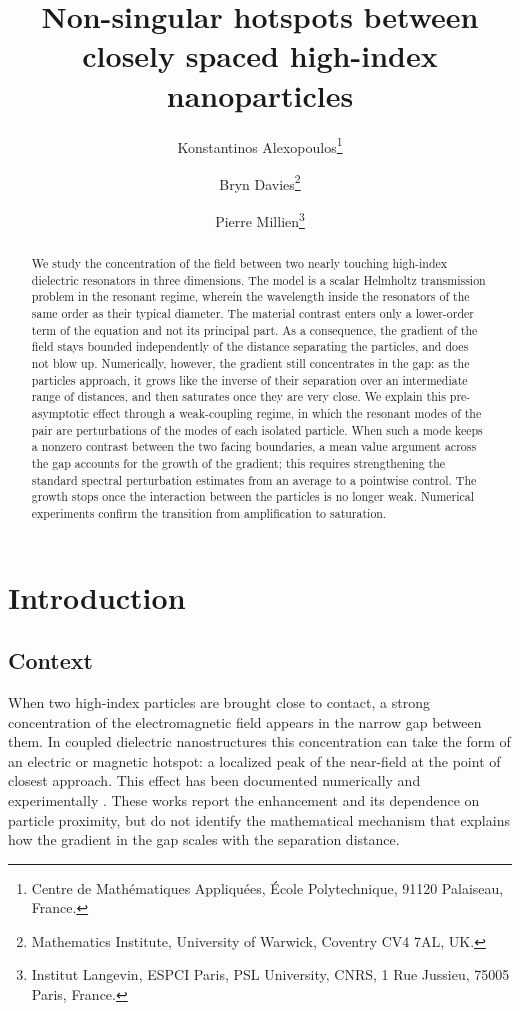 \documentclass[10pt]{article}
\title{Non-singular hotspots between closely spaced high-index nanoparticles}
\author{Konstantinos Alexopoulos\thanks{Centre de Mathématiques Appliquées, École Polytechnique, 91120 Palaiseau, France.} \and Bryn Davies\thanks{Mathematics Institute, University of Warwick, Coventry CV4 7AL, UK.} \and Pierre Millien\thanks{Institut Langevin, ESPCI Paris, PSL University, CNRS, 1 Rue Jussieu, 75005 Paris, France.}}
\date{}
\numberwithin{equation}{section}
\begin{document}
\maketitle

\begin{abstract}
    We study the concentration of the field between two nearly touching high-index dielectric resonators in three dimensions. The model is a scalar Helmholtz transmission problem in the resonant regime, wherein the wavelength inside the resonators of the same order as their typical diameter. The material contrast enters only a lower-order term of the equation and not its principal part. As a consequence, the gradient of the field stays bounded independently of the distance separating the particles, and does not blow up. Numerically, however, the gradient still concentrates in the gap: as the particles approach, it grows like the inverse of their separation over an intermediate range of distances, and then saturates once they are very close. We explain this pre-asymptotic effect through a weak-coupling regime, in which the resonant modes of the pair are perturbations of the modes of each isolated particle. When such a mode keeps a nonzero contrast between the two facing boundaries, a mean value argument across the gap accounts for the growth of the gradient; this requires strengthening the standard spectral perturbation estimates from an average to a pointwise control. The growth stops once the interaction between the particles is no longer weak. Numerical experiments confirm the transition from amplification to saturation.
\end{abstract}






\section{Introduction}

\subsection{Context}
When two high-index particles are brought close to contact, a strong concentration of the electromagnetic field appears in the narrow gap between them. In coupled dielectric nanostructures this concentration can take the form of an electric or magnetic hotspot: a localized peak of the  near-field at the point of closest approach. This effect has been documented numerically and experimentally \cite{bakker2015magnetic, mirzaei2015electric, calandrini2018magnetic, pascale2019full, van2016direct}. These works report the enhancement and its dependence on particle proximity,  but do not identify the mathematical mechanism that explains how the gradient in the gap scales with the separation distance.
\end{document}
